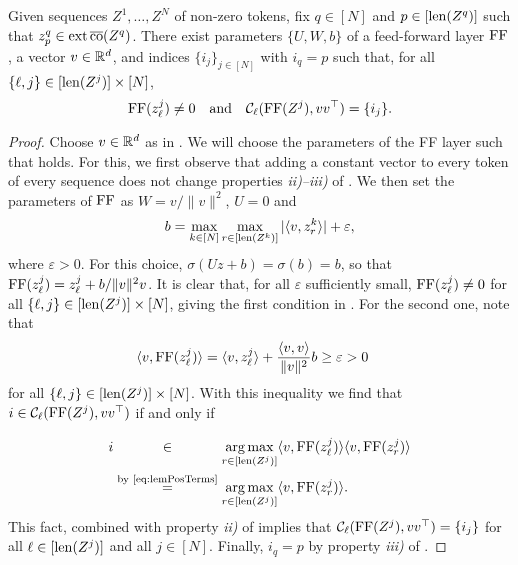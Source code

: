 \documentclass[11pt,a4paper]{amsart}
\begin{document}
\begin{lemma}\label{lem:chooseLeader}
Given sequences $Z^1, \dots, Z^N$ of non-zero tokens, fix $q\in [N]$ and $p\in [\operatorname{len} (Z^q)]$ such that $z_p^q \in \operatorname{ext}\operatorname{\overline{co}}(Z^q)$. There exist parameters $\{ U, W, b\}$ of a feed-forward layer $\operatorname{\mathrm{FF}}$, a vector $v\in \mathbb{R}^d$, and indices $\{i_j\}_{j\in [N]}$ with $i_q = p$ such that, for all $\{\ell, j\}\in [\operatorname{len} (Z^j)]\times [N]$,
\begin{equation}\label{eq:chooseLeaderLemma}
   \operatorname{\mathrm{FF}}(z_\ell^j) \neq 0 
   \quad\text{and}\quad
    \mathcal{C}_\ell(\operatorname{\mathrm{FF}}(Z^j), vv^\top) = \{ i_j \}.
\end{equation}
\end{lemma}
\begin{proof}
Choose $v\in\mathbb{R}^d$ as in . We will choose the parameters of the FF layer such that  holds. For this, we first observe that adding a constant vector to every token of every sequence does not change properties \textit{ii)--iii)} of . We then set the parameters of $\operatorname{\mathrm{FF}}$ as $W = v / \| v \|^2$, $U = 0$ and 
\begin{equation}
    b = \max_{k\in [N]} \max_{r\in [\operatorname{len} (Z^k)]}| \langle v, z_r^k \rangle| + \varepsilon,
\end{equation} 
where $\varepsilon > 0$. For this choice, $\sigma(Uz + b) = \sigma (b) = b$, so that $\operatorname{\mathrm{FF}}(z_\ell^j) = z_\ell^j + b/ {\| v \|^2} v$. It is clear that, for all $\varepsilon$ sufficiently small, $\operatorname{\mathrm{FF}}(z_\ell^j) \neq 0$ for all $\{\ell, j\}\in [\operatorname{len} (Z^j)]\times [N]$, giving the first condition in . For the second one, note that
\begin{align}\label{eq:lemPosTerms}
    \langle v, \operatorname{\mathrm{FF}}({z}_\ell^j) \rangle &= \langle v, z_\ell^j \rangle +  \frac{\langle v, v \rangle}{\|v\|^2} b \geq \varepsilon > 0
\end{align}
for all $\{ \ell, j\} \in [\operatorname{len} (Z^j)] \times [N]$. With this inequality we find that $i\in \mathcal{C}_\ell (\operatorname{\mathrm{FF}}(Z^j), vv^\top)$ if and only if
\begin{equation}
\begin{aligned}
    i &\overset{\phantom{\text{by \Cref{eq:lemPosTerms}}}}{\in}\argmax_{r \in [\len (Z^j)]} \ip{v}{\FF(z^j_\ell)} \ip{v}{\FF(z_r^j)} \\
    &\overset{\text{by \Cref{eq:lemPosTerms}}}{=} \argmax_{r \in [\len (Z^j)]}  \ip{v}{\FF(z_r^j)}.
\end{aligned}
\end{equation}
This fact, combined with property \textit{ii)} of  implies that $\mathcal{C}_\ell(\operatorname{\mathrm{FF}}(Z^j), vv^\top) = \{ i_j \}$ for all $\ell \in [\operatorname{len} (Z^j)]$ and all $j\in [N]$. Finally, $i_q = p$ by property \textit{iii)} of . 
\end{proof}
\end{document}

